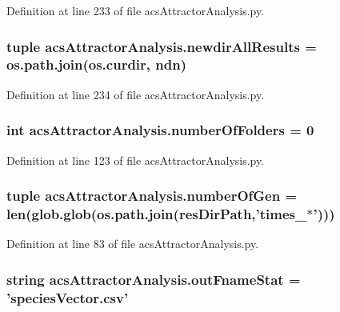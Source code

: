 Definition at line 233 of file acs\+Attractor\+Analysis.\+py.

\hypertarget{a00124_ae620f985669aed90dc070824420d4b5e}{
\subsubsection[{newdir\+All\+Results}]{\setlength{\rightskip}{0pt plus 5cm}tuple acs\+Attractor\+Analysis.\+newdir\+All\+Results = os.\+path.\+join(os.\+curdir, {\bf ndn})}}\label{a00124_ae620f985669aed90dc070824420d4b5e}


Definition at line 234 of file acs\+Attractor\+Analysis.\+py.

\hypertarget{a00124_aa5d2495d08b8ad5ebf34f85d5417e93c}{
\subsubsection[{number\+Of\+Folders}]{\setlength{\rightskip}{0pt plus 5cm}int acs\+Attractor\+Analysis.\+number\+Of\+Folders = 0}}\label{a00124_aa5d2495d08b8ad5ebf34f85d5417e93c}


Definition at line 123 of file acs\+Attractor\+Analysis.\+py.

\hypertarget{a00124_ac014a9b46a060e4fed96eaee9614345b}{
\subsubsection[{number\+Of\+Gen}]{\setlength{\rightskip}{0pt plus 5cm}tuple acs\+Attractor\+Analysis.\+number\+Of\+Gen = len(glob.\+glob(os.\+path.\+join({\bf res\+Dir\+Path},'times\+\_\+$\ast$')))}}\label{a00124_ac014a9b46a060e4fed96eaee9614345b}


Definition at line 83 of file acs\+Attractor\+Analysis.\+py.

\hypertarget{a00124_aeecfcdefbc44b2b2ceff4c9b6f737f27}{
\subsubsection[{out\+Fname\+Stat}]{\setlength{\rightskip}{0pt plus 5cm}string acs\+Attractor\+Analysis.\+out\+Fname\+Stat = 'species\+Vector.\+csv'}}\label{a00124_aeecfcdefbc44b2b2ceff4c9b6f737f27}


